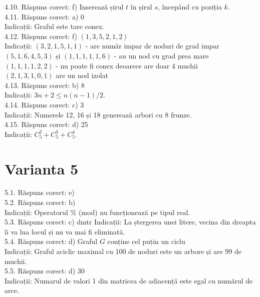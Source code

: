 4.10. Răspuns corect: f) Inserează șirul $t$ în șirul $s$, începând cu poziția $k$.\\

4.11. Răspuns corect: a) 0\\
Indicații: Graful este tare conex.\\

4.12. Răspuns corect: f) $(1,3,5,2,1,2)$\\
Indicații: $(3,2,1,5,1,1)$ - are număr impar de noduri de grad impar\\
$(5,1,6,4,5,3)$ și $(1,1,1,1,1,6)$ - au un nod cu grad prea mare\\
$(1,1,1,1,2,2)$ - nu poate fi conex deoarece are doar 4 muchii\\
$(2,1,3,1,0,1)$ are un nod izolat\\

4.13. Răspuns corect: b) 8\\
Indicații: $3 n + 2 \leq n ( n - 1 ) / 2$.\\

4.14. Răspuns corect: c) 3\\
Indicații: Numerele 12, 16 și 18 generează arbori cu 8 frunze.\\

4.15. Răspuns corect: d) 25\\
Indicații: $C_{5}^{2}+C_{5}^{3}+C_{5}^{4}$.\\

\section*{Varianta 5}

5.1. Răspuns corect: e)\\

5.2. Răspuns corect: b)\\
Indicații: Operatorul \% (mod) nu funcționează pe tipul real.\\

5.3. Răspuns corect: c) dmtr
Indicații: La ștergerea unei litere, vecina din dreapta îi va lua locul și nu va mai fi eliminată.\\

5.4. Răspuns corect: d) Graful $G$ conține cel puțin un ciclu\\
Indicații: Graful aciclic maximal cu 100 de noduri este un arbore și are 99 de muchii.\\

5.5. Răspuns corect: d) 30\\
Indicații: Numarul de valori 1 din matricea de adiacență este egal cu numărul de arce.\\

